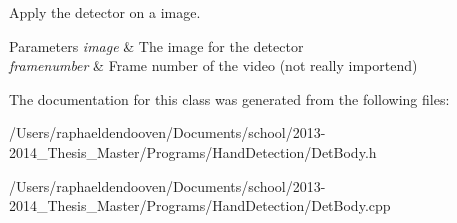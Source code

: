 Apply the detector on a image. 


\begin{DoxyParams}{Parameters}
{\em image} & The image for the detector \\
\hline
{\em framenumber} & Frame number of the video (not really importend) \\
\hline
\end{DoxyParams}


The documentation for this class was generated from the following files\-:\begin{DoxyCompactItemize}
\item 
/\-Users/raphaeldendooven/\-Documents/school/2013-\/2014\-\_\-\-Thesis\-\_\-\-Master/\-Programs/\-Hand\-Detection/Det\-Body.\-h\item 
/\-Users/raphaeldendooven/\-Documents/school/2013-\/2014\-\_\-\-Thesis\-\_\-\-Master/\-Programs/\-Hand\-Detection/Det\-Body.\-cpp\end{DoxyCompactItemize}
